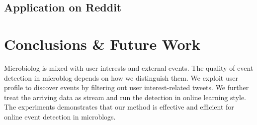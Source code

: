 \documentclass[conference,compsoc]{IEEEtran}
\begin{document}
\subsection{Application on Reddit}

\section{Conclusions \& Future Work}
Microbiolog is mixed with user interests and external events.
The quality of event detection in microblog depends on how we distinguish them.
We exploit user profile to discover events by filtering out user interest-related tweets.
We further treat the arriving data as stream and run the detection in online learning style.
The experiments demonstrates that our method is effective and efficient for online event detection in microblogs.



  
\end{document}
